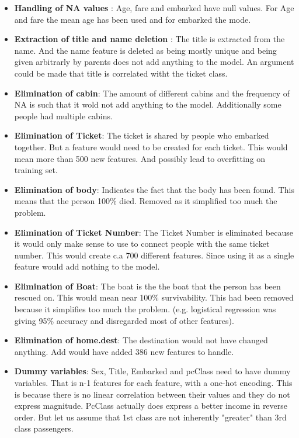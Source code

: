 \documentclass{article}
\begin{document}
\begin{itemize}
\item \textbf{Handling of NA values} : Age, fare and embarked have null values. For Age and fare the mean age has been used and for embarked the mode.
\item \textbf{Extraction of title and name deletion} : The title is extracted from the name. And the name feature is deleted as being mostly unique and being given arbitrarly by parents does not add anything to the model. An argument could be made that title is correlated witht the ticket class.  
\item \textbf{Elimination of cabin}: The amount of different cabins and the frequency of NA is such that it wold not add anything to the model. Additionally some people had multiple cabins.
\item \textbf{Elimination of Ticket}: The ticket is shared by people who embarked together. But a feature would need to be created for each ticket. This would mean more than 500 new features. And possibly lead to overfitting on training set. 
\item \textbf{Elimination of body}: Indicates the fact that the body has been found. This means that the person 100\% died. Removed as it simplified too much the problem. 
\item  \textbf{Elimination of Ticket Number}: The Ticket Number is eliminated because it would only make sense to use to connect people with the same ticket number. This would create c.a 700 different features. Since using it as a single feature would add nothing to the model.
\item \textbf{Elimination of Boat}: The boat is the the boat that the person has been rescued on. This would mean near 100\% survivability. This had been removed because it simplifies too much the problem. (e.g. logistical regression was giving  95\% accuracy and disregarded most of other features).
\item \textbf{Elimination of home.dest}: The destination would not have changed anything. Add would have added 386 new features to handle.
\item \textbf{Dummy variables}: Sex, Title, Embarked and pcClass need to have dummy variables. That is n-1 features for each feature, with a one-hot encoding. This is because there is no linear correlation between their values and they do not express magnitude. PcClass actually does express a better income in reverse order. But let us assume that 1st class are not inherently "greater" than 3rd class passengers.
\end{itemize}
\newpage
\end{document}

